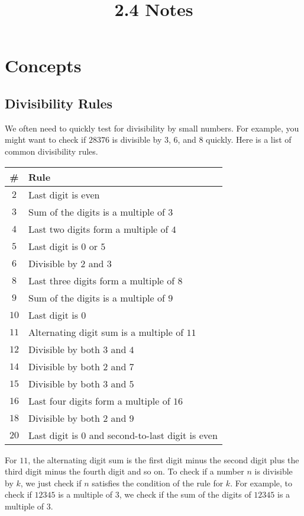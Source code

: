 \documentclass[twocolumn]{article}
\title{2.4 Notes}
\author{}
\date{}
\begin{document}
\maketitle

\section*{Concepts}

\subsection*{Divisibility Rules}
We often need to quickly test for divisibility by small numbers.
For example, you might want to check if $28376$ is divisible by $3$, $6$, and $8$ quickly.
Here is a list of common divisibility rules.

\begin{tabular}{|c|l|}
	\hline
	\# & Rule \\
	\hline
	$2$    & Last digit is even \\
	$3$    & Sum of the digits is a multiple of $3$ \\
	$4$    & Last two digits form a multiple of $4$ \\
	$5$    & Last digit is $0$ or $5$ \\
	$6$    & Divisible by $2$ and $3$ \\
	$8$    & Last three digits form a multiple of $8$ \\
	$9$    & Sum of the digits is a multiple of $9$ \\
	$10$   & Last digit is $0$ \\
	$11$   & Alternating digit sum is a multiple of $11$ \\
	$12$   & Divisible by both $3$ and $4$ \\
	$14$   & Divisible by both $2$ and $7$ \\
	$15$   & Divisible by both $3$ and $5$ \\
	$16$   & Last four digits form a multiple of $16$ \\
	$18$   & Divisible by both $2$ and $9$ \\
	$20$   & Last digit is $0$ and second-to-last digit is even \\
	\hline
\end{tabular}

For $11$, the alternating digit sum is the first digit minus the second digit plus the third digit
minus the fourth digit and so on.
To check if a number $n$ is divisible by $k$, we just check if $n$ satisfies the condition
of the rule for $k$.
For example, to check if $12345$ is a multiple of $3$, we check if the sum of the digits of $12345$
is a multiple of $3$.
\end{document}
